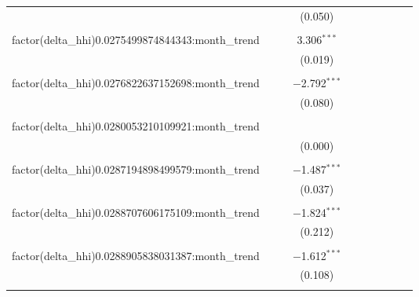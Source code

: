 \begin{table}[H]
{\begin{tabular}{@{\extracolsep{5pt}}lccccccccc}
   &  &  & (0.050) &  &  &  &  &  &  \\  

   & & & & & & & & & \\  

  factor(delta\_hhi)0.0275499874844343:month\_trend &  &  & 3.306$^{***}$ &  &  &  &  &  &  \\  

   &  &  & (0.019) &  &  &  &  &  &  \\  

   & & & & & & & & & \\  

  factor(delta\_hhi)0.0276822637152698:month\_trend &  &  & $-$2.792$^{***}$ &  &  &  &  &  &  \\  

   &  &  & (0.080) &  &  &  &  &  &  \\  

   & & & & & & & & & \\  

  factor(delta\_hhi)0.0280053210109921:month\_trend &  &  &  &  &  &  &  &  &  \\  

   &  &  & (0.000) &  &  &  &  &  &  \\  

   & & & & & & & & & \\  

  factor(delta\_hhi)0.0287194898499579:month\_trend &  &  & $-$1.487$^{***}$ &  &  &  &  &  &  \\  

   &  &  & (0.037) &  &  &  &  &  &  \\  

   & & & & & & & & & \\  

  factor(delta\_hhi)0.0288707606175109:month\_trend &  &  & $-$1.824$^{***}$ &  &  &  &  &  &  \\  

   &  &  & (0.212) &  &  &  &  &  &  \\  

   & & & & & & & & & \\  

  factor(delta\_hhi)0.0288905838031387:month\_trend &  &  & $-$1.612$^{***}$ &  &  &  &  &  &  \\  

   &  &  & (0.108) &  &  &  &  &  &  \\  

   & & & & & & & & & \\  


\end{tabular}}
\end{table}
